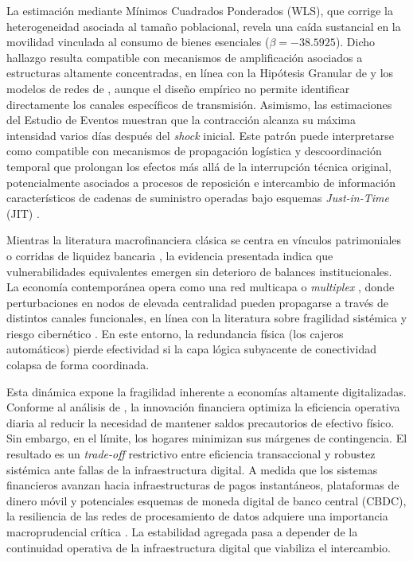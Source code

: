 La estimaci\'on mediante M\'inimos Cuadrados Ponderados (WLS), que corrige la heterogeneidad asociada al tama\~no poblacional, revela una ca\'ida sustancial en la movilidad vinculada al consumo de bienes esenciales ($\beta = -38.5925$). Dicho hallazgo resulta compatible con mecanismos de amplificaci\'on asociados a estructuras altamente concentradas, en l\'inea con la Hip\'otesis Granular de \cite{gabaix2011granular} y los modelos de redes de \cite{acemoglu2012network, carvalho2014micro}, aunque el dise\~no emp\'irico no permite identificar directamente los canales espec\'ificos de transmisi\'on. Asimismo, las estimaciones del Estudio de Eventos muestran que la contracci\'on alcanza su m\'axima intensidad varios d\'ias despu\'es del \textit{shock} inicial. Este patr\'on puede interpretarse como compatible con mecanismos de propagaci\'on log\'istica y descoordinaci\'on temporal que prolongan los efectos m\'as all\'a de la interrupci\'on t\'ecnica original, potencialmente asociados a procesos de reposici\'on e intercambio de informaci\'on caracter\'isticos de cadenas de suministro operadas bajo esquemas \textit{Just-in-Time} (JIT) \citep{carvalho2021supply, barrot2016input}.

Mientras la literatura macrofinanciera cl\'asica se centra en v\'inculos patrimoniales o corridas de liquidez bancaria \citep{allen2000financial, hanson2011macroprudential, borio2011implementing}, la evidencia presentada indica que vulnerabilidades equivalentes emergen sin deterioro de balances institucionales. La econom\'ia contempor\'anea opera como una red multicapa o \textit{multiplex} \citep{buldyrev2010catastrophic, dedomenico2013mathematical, kivela2014multilayer}, donde perturbaciones en nodos de elevada centralidad pueden propagarse a trav\'es de distintos canales funcionales, en l\'inea con la literatura sobre fragilidad sist\'emica y riesgo cibern\'etico \citep{acemoglu2015systemic, golub20222fragilitysurvey, tian2023cybersecurity, panetta2025systemic}. En este entorno, la redundancia f\'isica (los cajeros autom\'aticos) pierde efectividad si la capa l\'ogica subyacente de conectividad colapsa de forma coordinada.

Esta din\'amica expone la fragilidad inherente a econom\'ias altamente digitalizadas. Conforme al an\'alisis de \citep{alvarez2009financial}, la innovaci\'on financiera optimiza la eficiencia operativa diaria al reducir la necesidad de mantener saldos precautorios de efectivo f\'isico. Sin embargo, en el l\'imite, los hogares minimizan sus m\'argenes de contingencia. El resultado es un \textit{trade-off} restrictivo entre eficiencia transaccional y robustez sist\'emica ante fallas de la infraestructura digital. A medida que los sistemas financieros avanzan hacia infraestructuras de pagos instant\'aneos, plataformas de dinero m\'ovil y potenciales esquemas de moneda digital de banco central (CBDC), la resiliencia de las redes de procesamiento de datos adquiere una importancia macroprudencial cr\'itica \citep{auer2020technology, katzbcra2022}. La estabilidad agregada pasa a depender de la continuidad operativa de la infraestructura digital que viabiliza el intercambio. 

